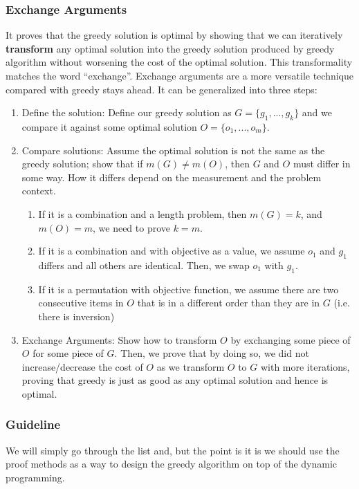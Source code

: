 \documentclass[../main.tex]{subfiles}
\begin{document}
\subsubsection{Exchange Arguments} It proves that the greedy solution is optimal by showing that we can iteratively \textbf{transform} any optimal solution into the greedy solution produced by greedy algorithm without worsening the cost of the optimal solution. This transformality matches the word ``exchange''. Exchange arguments are a more versatile technique compared with greedy stays ahead. 
It can be generalized into three steps:
\begin{enumerate}
    \item Define the solution: Define our greedy solution as $G=\{g_1, ..., g_k\}$ and we compare it against some optimal solution $O=\{o_1, ..., o_m\}$.
    \item Compare solutions: Assume the optimal solution is not the same as the greedy solution; show that if $m(G)\neq m(O)$, then $G$ and $O$ must  differ in some way. How it differs depend on the measurement and the problem context. 
    \begin{enumerate}
        \item If it is a combination and a length problem, then $m(G)=k$, and $m(O)=m$, we need to prove $k=m$.
        \item If it is a combination and with objective as a value, we assume $o_1$ and $g_1$ differs and all others are identical. Then, we swap $o_1$ with $g_1$. 
        \item If it is a permutation with objective function, we assume there are two consecutive items in $O$ that is in a different order than they are in $G$ (i.e. there is inversion)
    \end{enumerate}
    \item Exchange Arguments: Show how to transform $O$ by exchanging some piece of $O$ for some piece of $G$. Then, we prove that by doing so, we did not increase/decrease the cost of $O$ as we transform $O$ to $G$ with more iterations, proving that greedy is just as good as any optimal solution and hence is optimal. 
\end{enumerate}

\subsubsection{Guideline}
We will simply go through the list and, but the point is it is we should use the proof methods as a way to design the greedy algorithm on top of the dynamic programming. 
\end{document}
